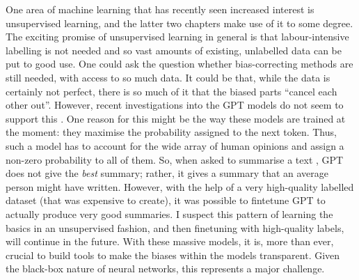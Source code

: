 One area of machine learning that has recently seen increased interest is unsupervised learning,
and the latter two chapters make use of it to some degree.
The exciting promise of unsupervised learning in general is
that labour-intensive labelling is not needed and so vast amounts of existing, unlabelled data can be put to good use.
One could ask the question whether bias-correcting methods are still needed, with access to so much data.
It could be that, while the data is certainly not perfect,
there is so much of it that the biased parts ``cancel each other out''.
However, recent investigations into the GPT models \citep{radford2018improving,radford2019language,brown2020language} do not seem to support this \citep{khalifa2021distributional}.
One reason for this might be the way these models are trained at the moment:
they maximise the probability assigned to the next token.
Thus, such a model has to account for the wide array of human opinions and assign a non-zero probability to all of them.
So, when asked to summarise a text \citep{stiennon2020learning}, GPT does not give the \emph{best} summary;
rather, it gives a summary that an average person might have written.
However, with the help of a very high-quality labelled dataset (that was expensive to create),
it was possible to fintetune GPT to actually produce very good summaries.
I suspect this pattern of learning the basics in an unsupervised fashion,
and then finetuning with high-quality labels, will continue in the future.
With these massive models,
it is, more than ever, crucial to build tools to make the biases within the models transparent.
Given the black-box nature of neural networks, this represents a major challenge.

